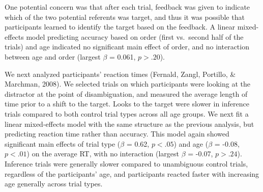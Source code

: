 \documentclass[a4paper,man,apacite,floatsintext]{apa6}
\begin{document}
One potential concern was that after each trial, feedback was given to
indicate which of the two potential referents was target, and thus it
was possible that participants learned to identify the target based on
the feedback. A linear mixed-effects model predicting accuracy based on
order (first vs.~second half of the trials) and age indicated no
significant main effect of order, and no interaction between age and
order (largest \(\beta\) = 0.061, \(p >.20\)).

We next analyzed participants' reaction times (Fernald, Zangl, Portillo,
\& Marchman, 2008). We selected trials on which participants were
looking at the distractor at the point of disambiguation, and measured
the average length of time prior to a shift to the target. Looks to the
target were slower in inference trials compared to both control trial
types across all age groups. We next fit a linear mixed-effects model
with the same structure as the previous analysis, but predicting
reaction time rather than accuracy. This model again showed significant
main effects of trial type (\(\beta\) = 0.62, \(p <.05\)) and age
(\(\beta\) = -0.08, \(p <.01\)) on the average RT, with no interaction
(largest \(\beta\) = -0.07, \(p >.24\)). Inference trials were generally
slower compared to unambiguous control trials, regardless of the
participants' age, and participants reacted faster with increasing age
generally across trial types.
\end{document}
